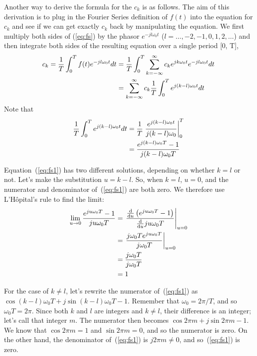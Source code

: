 Another way to derive the formula for the $c_k$ is as follows.  The aim of this derivation is to plug in the Fourier Series definition of $f(t)$ into the equation for $c_k$ and see if we can get exactly $c_k$ back by manipulating the equation. We
first multiply both sides of (\ref{eq:fs}) by the phasor
$e^{-jl\omega_0 t}$ ($l=\ldots, -2,-1,0,1,2,\ldots$) and then
integrate both sides of the resulting equation over a single period
[0, T],
\begin{align}
c_k=\frac{1}{T}\int_0^T f(t)e^{-jl\omega_0t}dt
&= \frac{1}{T}\int_0^T \sum_{k=-\infty}^{\infty} c_k e^{jk\omega_0t}
e^{-jl\omega_0 t}dt \notag\\
&= \sum_{k=-\infty}^{\infty} c_k \frac{1}{T}\int_0^T
e^{j(k-l)\omega_0t}dt
\label{eq:fs-ck2}
\end{align}
Note that
\begin{align}
\frac{1}{T}\int_0^T e^{j(k-l)\omega_0t}dt
&= \frac{1}{T}\left.\frac{e^{j(k-l)\omega_0t}}{j(k-l)\omega_0}
               \right|_0^T \notag\\
&= \frac{e^{j(k-l)\omega_0T} - 1}{j(k-l)\omega_0T}
    \label{eq:fs1}
\end{align}

Equation~(\ref{eq:fs1}) has two different solutions, depending on
whether $k=l$ or not. Let's make the substitution $u=k-l$. So, when
$k=l$, $u=0$, and the numerator and denominator of~(\ref{eq:fs1}) are
both zero. We therefore use L'H\^{o}pital's rule to find the limit:
\begin{align}
\lim_{u \rightarrow 0}
   \frac{e^{ju\omega_0T} - 1}{ju\omega_0T}
  & = \left.\frac{\frac{\mathrm{d} }{\mathrm{d} u}\left(e^{ju\omega_0T} - 1\right)}
                   {\frac{\mathrm{d} }{\mathrm{d} u}ju\omega_0T}\right|_{u=0} \notag\\
  & = \left.\frac{j\omega_0Te^{ju\omega_0T}}{j\omega_0T}\right|_{u=0}
        \notag\\
  & = \frac{j\omega_0T}{j\omega_0T} \notag\\
  & = 1
\end{align}

For the case of $k \neq l$, let's rewrite the numerator
of~(\ref{eq:fs1}) as $\cos(k-l)\omega_0T + j\sin(k-l)\omega_0T -
1$. Remember that $\omega_0=2\pi/T$, and so $\omega_0T=2\pi$. Since
both $k$ and $l$ are integers and $k \neq l$, their difference is an
integer; let's call that integer $m$. The numerator then becomes
$\cos2\pi m + j\sin2\pi m - 1$. We know that $\cos2\pi m = 1$ and
$\sin2\pi m = 0$, and so the numerator is zero. On the other hand, the
denominator of~(\ref{eq:fs1}) is $j2\pi m \neq 0$, and
so~(\ref{eq:fs1}) is zero.

